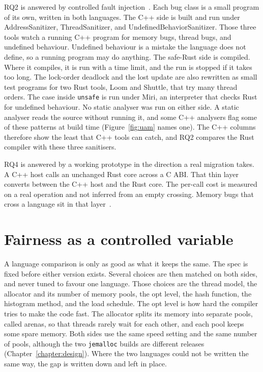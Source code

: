 \documentclass[english,oneside,a4paper,censored,csm,software-track-2020]{HYthesisML}
\begin{document}
RQ2 is answered by controlled fault injection~\cite{natella2016fault}. Each
bug class is a small program of its own, written in both languages. The C++
side is built and run under AddressSanitizer, ThreadSanitizer, and
UndefinedBehaviorSanitizer. Those three tools watch a running C++ program
for memory bugs, thread bugs, and undefined behaviour. Undefined behaviour
is a mistake the language does not define, so a running program may do
anything. The safe-Rust side is compiled. Where it compiles, it is run with
a time limit, and the run is stopped if it takes too long. The lock-order
deadlock and the lost update are also rewritten as small test programs for
two Rust tools, Loom and Shuttle, that try many thread orders. The case
inside \texttt{unsafe} is run under Miri, an interpreter that checks Rust for
undefined behaviour.
No static analyser was run on either side. A static
analyser reads the source without running it, and some C++ analysers flag
some of these patterns at build time (Figure~\ref{fig:uam} names one). The
C++ columns therefore show the least that C++ tools can catch, and RQ2
compares the Rust compiler with these three sanitisers.

RQ4 is answered by a working
prototype in the direction a real migration takes. A C++ host calls an
unchanged Rust core across a C ABI. That thin layer converts between the C++ host and the Rust core.
The per-call cost is measured on a real
operation and not inferred from an empty crossing. Memory bugs that cross a
language sit in that layer~\cite{li2022crosslang}.

\section{Fairness as a controlled variable}\label{sec:controlsbrief}
A language comparison is only as good as what it keeps the same. The spec
is fixed before either version exists. Several choices are then matched on
both sides, and never tuned to favour one language. Those choices are the
thread model, the allocator and its number of memory pools, the opt level,
the hash function, the histogram method, and the load schedule. The opt level
is how hard the compiler tries to make the code fast. The allocator splits its
memory into separate pools, called arenas, so that threads rarely wait for each
other, and each pool keeps some spare memory. Both sides use the same speed
setting and the same number of pools, although the two \texttt{jemalloc} builds are different
releases (Chapter~\ref{chapter:design}). Where the two languages could not be
written the same way, the gap is written down and left in place.
\end{document}

